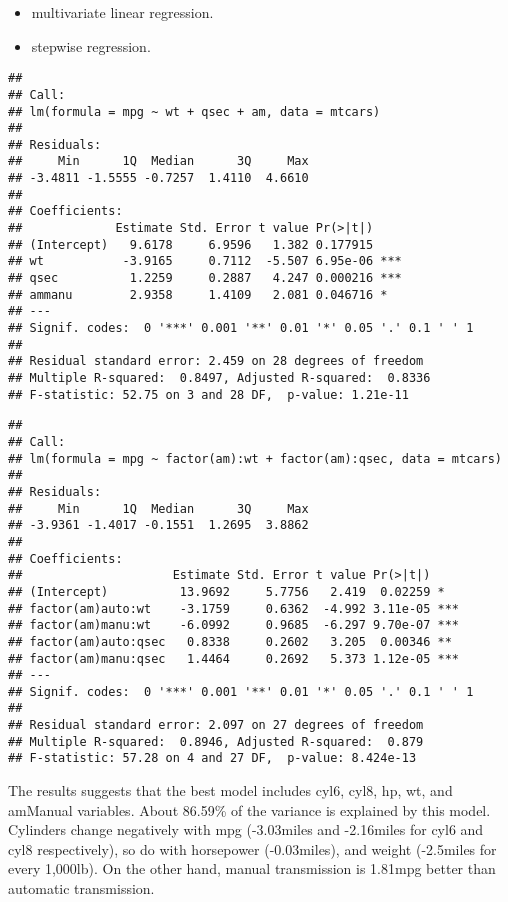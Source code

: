 \documentclass[]{article}
\providecommand{\tightlist}{%
  \setlength{\itemsep}{0pt}\setlength{\parskip}{0pt}}
\begin{document}
\begin{itemize}
\tightlist
\item
  multivariate linear regression.
\item
  stepwise regression.
\end{itemize}

\begin{verbatim}
## 
## Call:
## lm(formula = mpg ~ wt + qsec + am, data = mtcars)
## 
## Residuals:
##     Min      1Q  Median      3Q     Max 
## -3.4811 -1.5555 -0.7257  1.4110  4.6610 
## 
## Coefficients:
##             Estimate Std. Error t value Pr(>|t|)    
## (Intercept)   9.6178     6.9596   1.382 0.177915    
## wt           -3.9165     0.7112  -5.507 6.95e-06 ***
## qsec          1.2259     0.2887   4.247 0.000216 ***
## ammanu        2.9358     1.4109   2.081 0.046716 *  
## ---
## Signif. codes:  0 '***' 0.001 '**' 0.01 '*' 0.05 '.' 0.1 ' ' 1
## 
## Residual standard error: 2.459 on 28 degrees of freedom
## Multiple R-squared:  0.8497, Adjusted R-squared:  0.8336 
## F-statistic: 52.75 on 3 and 28 DF,  p-value: 1.21e-11
\end{verbatim}

\begin{verbatim}
## 
## Call:
## lm(formula = mpg ~ factor(am):wt + factor(am):qsec, data = mtcars)
## 
## Residuals:
##     Min      1Q  Median      3Q     Max 
## -3.9361 -1.4017 -0.1551  1.2695  3.8862 
## 
## Coefficients:
##                     Estimate Std. Error t value Pr(>|t|)    
## (Intercept)          13.9692     5.7756   2.419  0.02259 *  
## factor(am)auto:wt    -3.1759     0.6362  -4.992 3.11e-05 ***
## factor(am)manu:wt    -6.0992     0.9685  -6.297 9.70e-07 ***
## factor(am)auto:qsec   0.8338     0.2602   3.205  0.00346 ** 
## factor(am)manu:qsec   1.4464     0.2692   5.373 1.12e-05 ***
## ---
## Signif. codes:  0 '***' 0.001 '**' 0.01 '*' 0.05 '.' 0.1 ' ' 1
## 
## Residual standard error: 2.097 on 27 degrees of freedom
## Multiple R-squared:  0.8946, Adjusted R-squared:  0.879 
## F-statistic: 57.28 on 4 and 27 DF,  p-value: 8.424e-13
\end{verbatim}

The results suggests that the best model includes cyl6, cyl8, hp, wt,
and amManual variables. About 86.59\% of the variance is explained by
this model. Cylinders change negatively with mpg (-3.03miles and
-2.16miles for cyl6 and cyl8 respectively), so do with horsepower
(-0.03miles), and weight (-2.5miles for every 1,000lb). On the other
hand, manual transmission is 1.81mpg better than automatic transmission.
\end{document}
